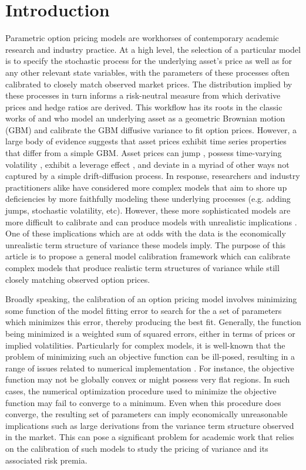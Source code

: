 \documentclass[12pt]{article}
\begin{document}
\section{Introduction}
Parametric option pricing models are workhorses of contemporary academic research and industry practice. At a high level, the selection of a particular model is to specify the stochastic process for the underlying asset's price as well as for any other relevant state variables, with the parameters of these processes often calibrated to closely match observed market prices. The distribution implied by these processes in turn informs a risk-neutral measure from which derivative prices and hedge ratios are derived. This workflow has its roots in the classic works of \cite{black1973pricing} and \cite{black1976pricing} who model an underlying asset as a geometric Brownian motion (GBM) and calibrate the GBM diffusive variance to fit option prices. However, a large body of evidence suggests that asset prices exhibit time series properties that differ from a simple GBM. Asset prices can jump \citep{carr2002fine, bollerslev2011tails}, possess time-varying volatility \citep{shephard2005stochastic}, exhibit a leverage effect \citep{carr2017leverage}, and deviate in a myriad of other ways not captured by a simple drift-diffusion process. In response, researchers and industry practitioners alike have considered more complex models that aim to shore up deficiencies by more faithfully modeling these underlying processes (e.g. adding jumps, stochastic volatility, etc). However, these more sophisticated models are more difficult to calibrate and can produce models with unrealistic implications \citep{cont2004nonparametric}. One of these implications which are at odds with the data is the economically unrealistic term structure of variance these models imply. The purpose of this article is to propose a general model calibration framework which can calibrate complex models that produce realistic term structures of variance while still closely matching observed option prices.

Broadly speaking, the calibration of an option pricing model involves minimizing some function of the model fitting error to search for the a set of parameters which minimizes this error, thereby producing the best fit. Generally, the function being minimized is a weighted sum of squared errors, either in terms of prices or implied volatilities. Particularly for complex models, it is well-known that the problem of minimizing such an objective function can be ill-posed, resulting in a range of issues related to numerical implementation  \citep{cont2003financial}. For instance, the objective function may not be globally convex or might possess very flat regions. In such cases, the numerical optimization procedure used to minimize the objective function may fail to converge to a minimum. Even when this procedure does converge, the resulting set of parameters can imply economically unreasonable implications such as large derivations from the variance term structure observed in the market. This can pose a significant problem for academic work that relies on the calibration of such models to study the pricing of variance and its associated risk premia. 
\end{document}
